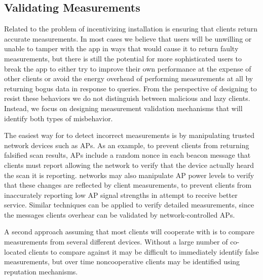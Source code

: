 \subsection{Validating Measurements}
\label{subsec-validation}

Related to the problem of incentivizing installation is ensuring that clients
return accurate measurements. In most cases we believe that users will be
unwilling or unable to tamper with the \PS{} app in ways that would cause it
to return faulty measurements, but there is still the potential for more
sophisticated users to break the app to either try to improve their own
performance at the expense of other clients or avoid the energy overhead of
performing measurements at all by returning bogus data in response to \PS{}
queries. From the perspective of designing \PS{} to resist these behaviors we
do not distinguish between malicious and lazy clients. Instead, we focus on
designing measurement validation mechanisms that will identify both types of
misbehavior.

The easiest way for \PS{} to detect incorrect measurements is by manipulating
trusted network devices such as APs. As an example, to prevent clients from
returning falsified scan results, \PS{} APs include a random nonce in each
beacon message that clients must report allowing the network to verify that
the device actually heard the scan it is reporting. \PS{} networks may also
manipulate AP power levels to verify that these changes are reflected by
client measurements, to prevent clients from inaccurately reporting low AP
signal strengths in attempt to receive better service. Similar techniques can
be applied to verify detailed measurements, since the messages clients
overhear can be validated by network-controlled APs.

A second approach assuming that most clients will cooperate with \PS{} is to
compare measurements from several different devices. Without a large number
of co-located clients to compare against it may be difficult to immediately
identify false measurements, but over time noncooperative clients may be
identified using reputation mechanisms.
